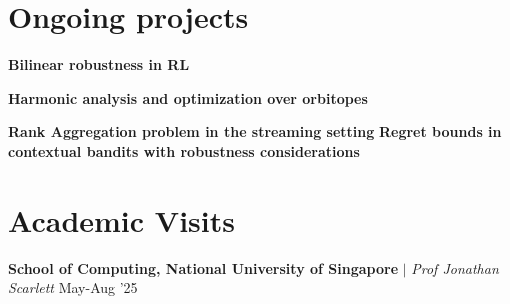 

\resumeSubHeadingListEnd

\section{Ongoing projects}
\resumeSubHeadingListStart
\resumeProjectHeading
{\textbf{Bilinear robustness in RL}}
{}
{}
\vspace{\mygap}

\resumeProjectHeading
{\textbf{Harmonic analysis and optimization over orbitopes}}
{}
{}
\vspace{\mygap}



\resumeProjectHeading
{\textbf{Rank Aggregation problem in the streaming setting}}
{}
{}
\vspace{\mygap}
\resumeProjectHeading
{\textbf{Regret bounds in contextual bandits with robustness considerations}}
{}
{}
\vspace{\gap}
\resumeSubHeadingListEnd


\section{Academic Visits}
\resumeSubHeadingListStart

\resumeProjectHeading
{\textbf{School of Computing, National University of Singapore} $|$ \textit{Prof Jonathan Scarlett}}
{May-Aug '25}
{}
\vspace{\gap}
\resumeSubHeadingListEnd



